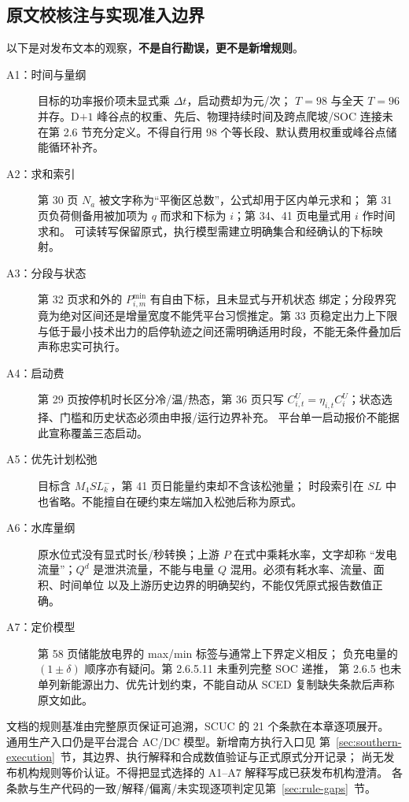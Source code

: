 \subsection{原文校核注与实现准入边界}\label{sec:southern-ambiguities}
以下是对发布文本的观察，\textbf{不是自行勘误，更不是新增规则}。
\begin{description}
 \item[A1：时间与量纲] 目标的功率报价项未显式乘 $\Delta t$，启动费却为元/次；
 $T=98$ 与全天 $T=96$ 并存。D$+1$ 峰谷点的权重、先后、物理持续时间及跨点爬坡/SOC
 连接未在第 2.6 节充分定义。不得自行用 98 个等长段、默认费用权重或峰谷点储能循环补齐。
 \item[A2：求和索引] 第 30 页 $N_a$ 被文字称为“平衡区总数”，公式却用于区内单元求和；
 第 31 页负荷侧备用被加项为 $q$ 而求和下标为 $i$；第 34、41 页电量式用 $i$ 作时间求和。
 可读转写保留原式，执行模型需建立明确集合和经确认的下标映射。
 \item[A3：分段与状态] 第 32 页求和外的 $P^{\min}_{i,m}$ 有自由下标，且未显式与开机状态
 绑定；分段界究竟为绝对区间还是增量宽度不能凭平台习惯推定。第 33 页稳定出力上下限
 与低于最小技术出力的启停轨迹之间还需明确适用时段，不能无条件叠加后声称忠实可执行。
 \item[A4：启动费] 第 29 页按停机时长区分冷/温/热态，第 36 页只写
 $C^U_{i,t}=\eta_{i,t}C_i^U$；状态选择、门槛和历史状态必须由申报/运行边界补充。
 平台单一启动报价不能据此宣称覆盖三态启动。
 \item[A5：优先计划松弛] 目标含 $M_4SL_k^-$，第 41 页日能量约束却不含该松弛量；
 时段索引在 $SL$ 中也省略。不能擅自在硬约束左端加入松弛后称为原式。
 \item[A6：水库量纲] 原水位式没有显式时长/秒转换；上游 $P$ 在式中乘耗水率，文字却称
 “发电流量”；$Q^d$ 是泄洪流量，不能与电量 $Q$ 混用。必须有耗水率、流量、面积、时间单位
 以及上游历史边界的明确契约，不能仅凭原式报告数值正确。
 \item[A7：定价模型] 第 58 页储能放电界的 max/min 标签与通常上下界定义相反；
 负充电量的 $(1\pm\delta)$ 顺序亦有疑问。第 2.6.5.11 未重列完整 SOC 递推，
 第 2.6.5 也未单列新能源出力、优先计划约束，不能自动从 SCED 复制缺失条款后声称原文如此。
\end{description}
\begin{gapnote}
文档的规则基准由完整原页保证可追溯，SCUC 的 21 个条款在本章逐项展开。
通用生产入口仍是平台混合 AC/DC 模型。新增南方执行入口见
第~\ref{sec:southern-execution}~节，其边界、执行解释和合成数值验证与正式原式分开记录；
尚无发布机构规则等价认证。不得把显式选择的 A1--A7 解释写成已获发布机构澄清。
各条款与生产代码的一致/解释/偏离/未实现逐项判定见第~\ref{sec:rule-gaps}~节。
\end{gapnote}
